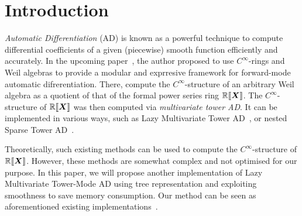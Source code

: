 \documentclass[rims-smooth-paper.tex]{subfiles}
\begin{document}
\section{Introduction}
\label{sec:intro}
\emph{Automatic Differentiation} (AD) is known as a powerful technique to compute differential coefficients of a given (piecewise) smooth function efficiently and accurately.
In the upcoming paper~\cite{Ishii:2021vw}, the author proposed to use \emph{$C^\infty$}-rings and Weil algebras to provide a modular and exprresive framework for forward-mode automatic difrerentiation.
There, compute the $C^\infty$-structure of an arbitrary Weil algebra as a quotient of that of the formal power series ring $\mathbb{R}\llbracket\boldsymbol{X}\rrbracket$.
The $C^\infty$-structure of $\mathbb{R}\llbracket\boldsymbol{X}\rrbracket$ was then computed via \emph{multivariate tower AD}.
It can be implemented in various ways, such as Lazy Multivariate Tower AD~\cite{Pearlmutter:2007aa}, or nested Sparse Tower AD~\cite[{module \texttt{Numeric.AD.Rank1.Sparse}}]{Kmett:2010aa}.

Theoretically, such existing methods can be used to compute the $C^\infty$-structure of $\mathbb{R}\llbracket\boldsymbol{X}\rrbracket$.
However, these methods are somewhat complex and not optimised for our purpose.
In this paper, we will propose another implementation of Lazy Multivariate Tower-Mode AD using tree representation and exploiting smoothness to save memory consumption.
Our method can be seen as aforementioned existing implementations~\cite{Pearlmutter:2007aa,Kmett:2010aa}.
\end{document}
